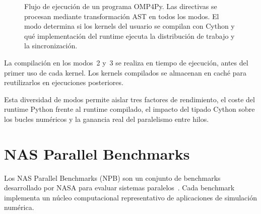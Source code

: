 \begin{figure}[htbp]
\centering
{}
\caption{Flujo de ejecución de un programa OMP4Py. Las directivas se procesan
mediante transformación AST en todos los modos. El modo determina si los
kernels del usuario se compilan con Cython y qué implementación del runtime
ejecuta la distribución de trabajo y la sincronización.}
\label{fig:contexto-pipeline}
\end{figure}

La compilación en los modos~2 y~3 se realiza en tiempo de ejecución, antes del
primer uso de cada kernel. Los kernels compilados se almacenan en caché para
reutilizarlos en ejecuciones posteriores.

Esta diversidad de modos permite aislar tres factores de rendimiento, el coste del
runtime Python frente al runtime compilado, el impacto del tipado Cython sobre
los bucles numéricos y la ganancia real del paralelismo entre hilos.


\section{NAS Parallel Benchmarks}
\label{sec:nas}

Los NAS Parallel Benchmarks (NPB) son un conjunto de benchmarks desarrollado
por NASA para evaluar sistemas paralelos~\cite{NPB1994}. Cada benchmark
implementa un núcleo computacional representativo de aplicaciones de
simulación numérica.

